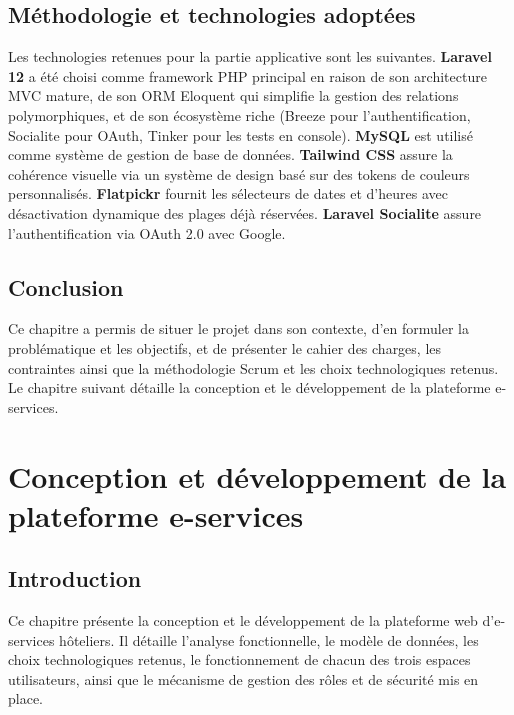 \documentclass[12pt,a4paper]{report}
\begin{document}
\section{Méthodologie et technologies adoptées}

Les technologies retenues pour la partie applicative sont les suivantes.
\textbf{Laravel 12} a été choisi comme framework PHP principal en raison
de son architecture MVC mature, de son ORM Eloquent qui simplifie la
gestion des relations polymorphiques, et de son écosystème riche (Breeze
pour l'authentification, Socialite pour OAuth, Tinker pour les tests en
console). \textbf{MySQL} est utilisé comme système de gestion de base de
données. \textbf{Tailwind CSS} assure la cohérence visuelle via un
système de design basé sur des tokens de couleurs personnalisés.
\textbf{Flatpickr} fournit les sélecteurs de dates et d'heures avec
désactivation dynamique des plages déjà réservées. \textbf{Laravel
Socialite} assure l'authentification via OAuth 2.0 avec Google.

\section{Conclusion}

Ce chapitre a permis de situer le projet dans son contexte, d'en formuler
la problématique et les objectifs, et de présenter le cahier des charges,
les contraintes ainsi que la méthodologie Scrum et les choix technologiques
retenus. Le chapitre suivant détaille la conception et le développement de
la plateforme e-services.

\chapter{Conception et développement de la plateforme e-services}

\section{Introduction}

Ce chapitre présente la conception et le développement de la plateforme
web d'e-services hôteliers. Il détaille l'analyse fonctionnelle, le modèle
de données, les choix technologiques retenus, le fonctionnement de chacun
des trois espaces utilisateurs, ainsi que le mécanisme de gestion des
rôles et de sécurité mis en place.
\end{document}
